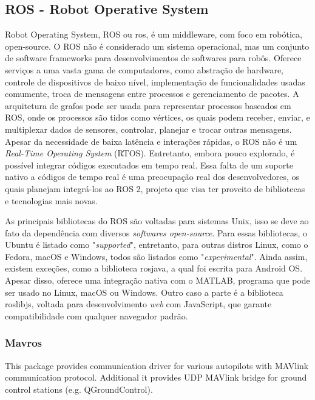 \documentclass[12pt,a4paper,oneside]{book}
\begin{document}
\subsection{ROS - Robot Operative System}

Robot Operating System, ROS ou ros, é um middleware, 
com foco em robótica, open-source. O ROS não é considerado 
um sistema operacional, mas um conjunto de software 
frameworks para desenvolvimentos de softwares para robôs. 
Oferece serviços a uma vasta gama de computadores, 
como abstração de hardware, controle de dispositivos 
de baixo nível, implementação de funcionalidades usadas 
comumente, troca de mensagens entre processos e 
gerenciamento de pacotes. A arquitetura de grafos 
pode ser usada para representar processos baseados 
em ROS, onde os processos são tidos como vértices, 
os quais podem receber, enviar, e multiplexar 
dados de sensores, controlar, planejar e trocar 
outras mensagens. Apesar da necessidade de baixa latência
e interações rápidas, o ROS não é um \textit{Real-Time
Operating System} (RTOS). Entretanto, embora pouco explorado,
é possível integrar códigos executados em tempo real.
Essa falta de um suporte nativo a códigos de tempo real é
uma preocupação real dos desenvolvedores, os quais planejam 
integrá-los ao ROS 2, projeto que visa ter proveito de 
bibliotecas e tecnologias mais novas. 

As principais bibliotecas do ROS são voltadas para sistemas
Unix, isso se deve ao fato da dependência com diversos
\textit{softwares open-source}. Para essas bibliotecas,
o Ubuntu é listado como "\textit{supported}", entretanto,
para outras distros Linux, como o Fedora, macOS e Windows,
todos são listados como "\textit{experimental}". Ainda assim,
existem exceções, como a biblioteca rosjava, a qual foi 
escrita para Android OS. Apesar disso, oferece uma integração
nativa com o MATLAB, programa que pode ser usado no Linux,
macOS ou Windows. Outro caso a parte é a biblioteca roslibjs,
voltada para desenvolvimento \textit{web} com JavaScript,
que garante compatibilidade com qualquer navegador padrão.


\subsubsection{Mavros}

This package provides communication driver for various autopilots with MAVlink communication protocol. Additional it provides UDP MAVlink bridge for ground control stations (e.g. QGroundControl).
\end{document}
